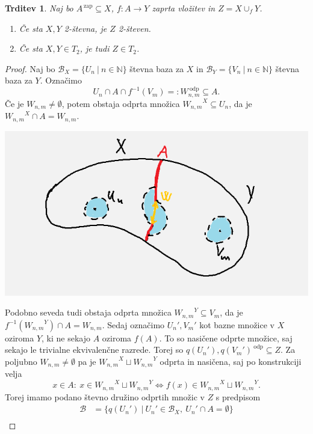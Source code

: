 \documentclass[10pt, a4paper]{article}
\newtheorem{trditev}[izr]{Trditev}
\newenvironment{noticeC}{%
  \tcolorbox[%
  notitle,
  empty,
  enhanced,  %
  breakable,
  coltext=black, 
  fontupper=\rmfamily,
  noparskip,
  sharp corners,
  boxrule=-1pt,  %
  frame hidden,
  left=7pt,  %
  right=7pt,
  top=5pt,
  bottom=5pt,
  before skip=2.5ex plus 2pt,
  after skip=2.5ex plus 2pt,
  overlay unbroken and last={%
  },
  ]}
{\endtcolorbox}
\newenvironment{dokaz}%
  {\begin{noticeC}\begin{proof}}%
  {\end{proof}\end{noticeC}}
\newcommand{\N}{\mathbb {N}}
\begin{document}
\begin{trditev}\label{trd:1}
  Naj bo $A^{\,\text{zap}} \subseteq X$, $f: A \to Y$ zaprta vložitev in $Z = X \cup_f Y$.
  \begin{enumerate}
    \item Če sta $X, Y$ 2-števna, je $Z$ 2-števen.
    \item Če sta $X, Y \in T_2$, je tudi $Z \in T_2$. 
  \end{enumerate}
\end{trditev}

\begin{dokaz}
  Naj bo $\mathcal{B}_X = \{U_n\ |\ n \in \N\}$ števna baza za $X$ in 
  $\mathcal{B}_Y = \{V_n\ |\ n \in \N\}$ števna baza za $Y$.
  Označimo $$U_n \cap A \cap f^{-1} (V_m) =: W_{n, m}^{\ \text{odp}} \subseteq A.$$
  Če je $W_{n, m} \neq \emptyset$, potem obstaja odprta množica ${W_{n, m} }^X \subseteq U_n$,
  da je ${W_{n, m} }^X \cap A = W_{n, m}$.
  \begin{center}
    \includegraphics[scale=0.6]{dokaz1.png}
  \end{center}
  Podobno seveda tudi obstaja odprta množica ${W_{n, m} }^Y \subseteq V_m$,
  da je $f^{-1}({W_{n, m} }^Y) \cap A = W_{n, m}$.
  Sedaj označimo $U_n', V_m'$ kot bazne množice v $X$ oziroma $Y$, ki ne sekajo $A$ oziroma 
  $f(A)$. To so nasičene odprte množice, saj sekajo le trivialne ekvivalenčne razrede.
  Torej so $q(U_n'), q(V_m')^{\ \text{odp}} \subseteq Z$.
  Za poljubno $W_{n, m} \neq \emptyset$ pa je ${W_{n, m} }^{X} \sqcup {W_{n, m} }^{Y}$
  odprta in nasičena, saj po konstrukciji velja 
  $$x \in A:\ x \in {W_{n, m} }^{X} \sqcup {W_{n, m} }^{Y} \Leftrightarrow f(x) \in {W_{n, m} }^{X} \sqcup {W_{n, m} }^{Y}.$$
  Torej imamo podano števno družino odprtih množic v $Z$ s predpisom 
  \begin{align*}
    \mathcal{B} &= \{q(U_n')\ |\ U_n' \in \mathcal{B}_X,\ U_n' \cap A = \emptyset\}\\

\end{align*}
\end{dokaz}
\end{document}
